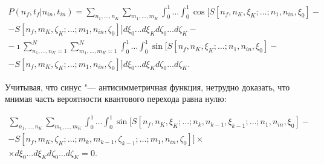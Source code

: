 \begin{multline}

\label{biruk:34}

P(n_f,t_f|n_{in},t_{in}) {=}\sum\limits_{n_{1},\dots,n_{K}} \sum\limits_{m_{1},\dots,m_{K}} \int _{0}^{1} \dots \int _{0}^{1}

\cos\bigl[S[n_f,n_{K},\xi_K;\dots ;n_{1},n_{in},\xi_0]

-

\\

-

S[n_f,m_{K},\zeta_K;\dots ;m_{1},n_{in},\zeta_0] \bigr]d\xi_0 \dots d\xi_K d\zeta_0 \dots d\zeta_K

-

\\

-

\imath\sum\limits_{n_{1},\dots,n_{K}=1}^{N} \sum\limits_{m_{1},\dots,m_{K}=1}^{N} \int _{0}^{1} \dots \int _{0}^{1}

\sin\bigl[S[n_f,n_{K},\xi_K;\dots ;n_{1},n_{in},\xi_0]

-

\\

-

S[n_f,m_{K},\zeta_K;\dots ;m_{1},n_{in},\zeta_0] \bigr]d\xi_0\dots d\xi_K d\zeta_0\dots d\zeta_K

.

\end{multline}

Учитывая, что синус "--- антисимметричная функция, нетрудно доказать, что мнимая часть вероятности квантового перехода равна нулю:

\begin{multline}

\label{biruk:35}

\sum\limits_{n_{1},\dots,n_{K}} \sum\limits_{m_{1},\dots,m_{K}} \int _{0}^{1} \dots \int _{0}^{1}

\sin\bigl[S[n_f,n_{K},\xi_K;\dots ;n_k,n_{k-1},\xi_{k-1};\dots ;n_{1},n_{in},\xi_0]

-

\\

-

S[n_f,m_{K},\zeta_K;\dots ;m_k,m_{k-1},\zeta_{k-1};\dots ;m_{1},n_{in},\zeta_0] \bigr]

\times \\

\times

d\xi_0\dots d\xi_K d\zeta_0\dots d\zeta_K=0. 

\end{multline}


